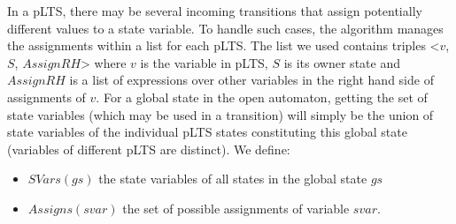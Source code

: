 \documentclass{lncs/llncs}
\newcommand{\QIN}[1]{\textcolor{airforceblue}{#1}}
\begin{document}
In a pLTS, there may be several incoming transitions 
that assign potentially different values to a state variable.
To handle such cases, the algorithm manages the assignments
within a list for each pLTS.
The list we used contains triples <$v$, $S$, $AssignRH$> 
where $v$ is the variable in pLTS, $S$ is its owner state and
$AssignRH$ is a list of expressions over other variables in the right
hand side of assignments of $v$.
For a global state in the open automaton, getting the set of state
variables (which may be used in a transition) will simply be the union
of state variables of the individual pLTS states constituting this
global state (variables of different pLTS are distinct). We define:
\begin{itemize}
  \item $SVars(gs)$ the state variables of all states in the global
    state $gs$
  \item $Assigns(svar)$ the set of possible assignments of variable
      $svar$.
\end{itemize}



\end{document}

